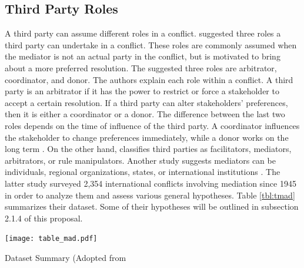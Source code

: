 \documentclass[letterpaper,12pt,titlepage,oneside,final]{book}
\begin{document}
\subsection{Third Party Roles}
\label{sec:tproles}
A third party can assume different roles in a conflict. \citet{sakamoto2005} suggested three roles a third party can undertake in a conflict. These roles are commonly assumed when the mediator is not an actual party in the conflict, but is motivated to bring about a more preferred resolution. The suggested three roles are arbitrator, coordinator, and donor. The authors explain each role within a conflict. A third party is an arbitrator if it has the power to restrict or force a stakeholder to accept a certain resolution. If a third party can alter stakeholders' preferences, then it is either a coordinator or a donor. The difference between the last two roles depends on the time of influence of the third party. A coordinator influences the stakeholder to change preferences immediately, while a donor works on the long term \citep{sakamoto2005}. On the other hand, \citet{raiffa1982} classifies third parties as facilitators, mediators, arbitrators, or rule manipulators. Another study suggests mediators can be individuals, regional organizations, states, or international institutions \citep{bercovitch2000,bercovitch2006}. The latter study surveyed 2,354 international conflicts involving mediation since 1945 in order to analyze them and assess various general hypotheses. Table \ref{tbl:tmad} summarizes their dataset. Some of their hypotheses will be outlined in subsection 2.1.4 of this proposal. 

\begin{center}
\begin{table}[h!]
\centering
\texttt{[image: table\_mad.pdf]}

\caption{Dataset Summary (Adopted from \citet{bercovitch2006}}

\label{tbl:tmad}
\end{table}
\end{center}
\end{document}
